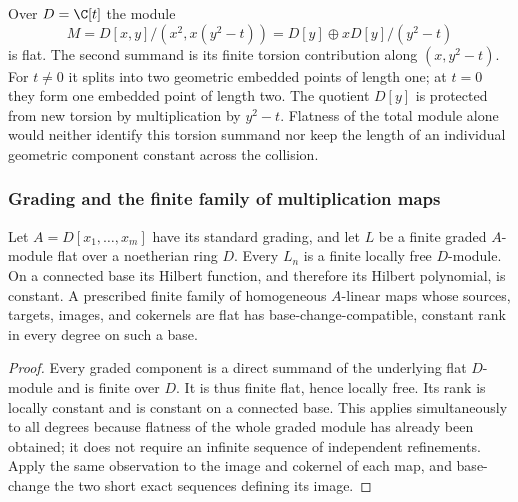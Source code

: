 \begin{remark}
Over \(D=\C[t]\) the module
\[
 M=D[x,y]/(x^2,x(y^2-t))
 =D[y]\oplus xD[y]/(y^2-t)
\]
is flat.  The second summand is its finite torsion contribution along
\((x,y^2-t)\).  For \(t\ne0\) it splits into two geometric embedded
points of length one; at \(t=0\) they form one embedded point of
length two.  The quotient \(D[y]\) is protected from new torsion by
multiplication by \(y^2-t\).  Flatness of the total module alone
would neither identify this torsion summand nor keep the length of an
individual geometric component constant across the collision.
\end{remark}

\subsubsection{Grading and the finite family of multiplication maps}

\begin{lemma}
\label{lem:graded-flat-diagram}
Let \(A=D[x_1,\ldots,x_m]\) have its standard grading, and let
\(L\) be a finite graded \(A\)-module flat over a noetherian ring
\(D\).  Every \(L_n\) is a finite locally free \(D\)-module.  On
a connected base its Hilbert function, and therefore its Hilbert
polynomial, is constant.  A prescribed finite family of homogeneous
\(A\)-linear maps whose sources, targets, images, and cokernels are
flat has base-change-compatible, constant rank in every degree on
such a base.
\end{lemma}
\begin{proof}
Every graded component is a direct summand of the underlying flat
\(D\)-module and is finite over \(D\).  It is thus finite flat,
hence locally free.  Its rank is locally constant and is constant on
a connected base.  This applies simultaneously to all degrees because
flatness of the whole graded module has already been obtained; it does
not require an infinite sequence of independent refinements.  Apply
the same observation to the image and cokernel of each map, and
base-change the two short exact sequences defining its image.
\end{proof}
